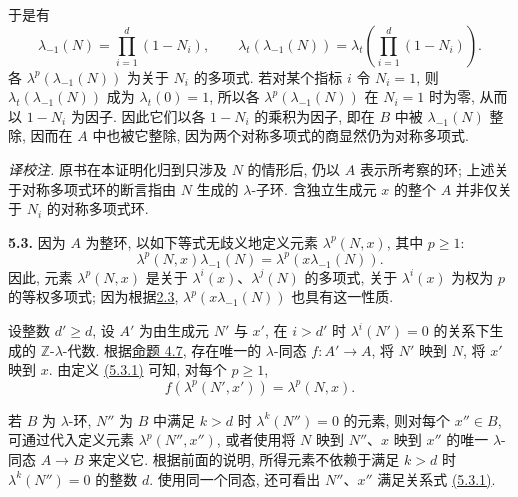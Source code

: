 于是有
\[
 \lambda_{-1}(N)=\prod_{i=1}^d(1-N_i),\qquad
 \lambda_t(\lambda_{-1}(N))
 =\lambda_t\!\left(\prod_{i=1}^d(1-N_i)\right).
\]
各 \(\lambda^p(\lambda_{-1}(N))\) 为关于 \(N_i\) 的多项式. 若对某个指标 \(i\) 令 \(N_i=1\), 则 \(\lambda_t(\lambda_{-1}(N))\) 成为 \(\lambda_t(0)=1\), 所以各 \(\lambda^p(\lambda_{-1}(N))\) 在 \(N_i=1\) 时为零, 从而以 \(1-N_i\) 为因子. 因此它们以各 \(1-N_i\) 的乘积为因子, 即在 \(B\) 中被 \(\lambda_{-1}(N)\) 整除, 因而在 \(A\) 中也被它整除, 因为两个对称多项式的商显然仍为对称多项式.

\emph{译校注.} 原书在本证明化归到只涉及 \(N\) 的情形后, 仍以 \(A\) 表示所考察的环; 上述关于对称多项式环的断言指由 \(N\) 生成的 \(\lambda\)-子环. 含独立生成元 \(x\) 的整个 \(A\) 并非仅关于 \(N_i\) 的对称多项式环.

\textbf{5.3.} 因为 \(A\) 为整环, 以如下等式无歧义地定义元素 \(\lambda^p(N,x)\), 其中 \(p\ge1\):
\begin{equation}\tag{5.3.1}
  \lambda^p(N,x)\lambda_{-1}(N)=\lambda^p(x\lambda_{-1}(N)).
\end{equation}
因此, 元素 \(\lambda^p(N,x)\) 是关于 \(\lambda^i(x)\)、\(\lambda^j(N)\) 的多项式, 关于 \(\lambda^i(x)\) 为权为 \(p\) 的等权多项式; 因为根据\hyperlink{sga6.e05.eq.2-3-1}{2.3}, \(\lambda^p(x\lambda_{-1}(N))\) 也具有这一性质.

设整数 \(d'\ge d\), 设 \(A'\) 为由生成元 \(N'\) 与 \(x'\), 在 \(i>d'\) 时 \(\lambda^i(N')=0\) 的关系下生成的 \(\mathbb Z\)-\(\lambda\)-代数. 根据\hyperlink{sga6.e05.prop.4-7}{命题 4.7}, 存在唯一的 \(\lambda\)-同态 \(f:A'\to A\), 将 \(N'\) 映到 \(N\), 将 \(x'\) 映到 \(x\). 由定义 \hyperlink{sga6.e05.eq.5-3-1}{(5.3.1)} 可知, 对每个 \(p\ge1\),
\[
 f(\lambda^p(N',x'))=\lambda^p(N,x).
\]

若 \(B\) 为 \(\lambda\)-环, \(N''\) 为 \(B\) 中满足 \(k>d\) 时 \(\lambda^k(N'')=0\) 的元素, 则对每个 \(x''\in B\), 可通过代入定义元素 \(\lambda^p(N'',x'')\), 或者使用将 \(N\) 映到 \(N''\)、\(x\) 映到 \(x''\) 的唯一 \(\lambda\)-同态 \(A\to B\) 来定义它. 根据前面的说明, 所得元素不依赖于满足 \(k>d\) 时 \(\lambda^k(N'')=0\) 的整数 \(d\). 使用同一个同态, 还可看出 \(N''\)、\(x''\) 满足关系式 \hyperlink{sga6.e05.eq.5-3-1}{(5.3.1)}.

